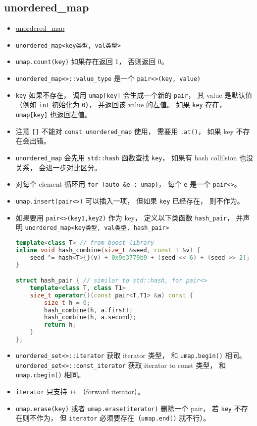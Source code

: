 \subsection{unordered\_map}
\begin{itemize}
\item \href{https://cplusplus.com/reference/unordered_map/unordered_map/}{unordered\_map}
\item \verb|unordered_map<key类型, val类型>|
\item \verb|umap.count(key)| 如果存在返回 1， 否则返回 0。
\item \verb|unordered_map<>::value_type| 是一个 \verb|pair<>(key, value)|
\item \verb|key| 如果不存在， 调用 \verb|umap[key]| 会生成一个新的 \verb|pair|， 其 value 是默认值 （例如 \verb|int| 初始化为 \verb|0|）， 并返回该 value 的左值。 如果 \verb|key| 存在， \verb|umap[key]| 也返回左值。
\item 注意 \verb|[]| 不能对 \verb|const unordered_map| 使用， 需要用 \verb|.at()|， 如果 key 不存在会出错。
\item \verb|unordered_map| 会先用 \verb|std::hash| 函数查找 \verb|key|， 如果有 hash collilsion 也没关系， 会进一步对比区分。
\item 对每个 element 循环用 \verb|for (auto &e : umap)|， 每个 \verb|e| 是一个 \verb|pair<>|。
\item \verb|umap.insert(pair<>)| 可以插入一项， 但如果 \verb|key| 已经存在， 则不作为。
\item 如果要用 \verb|pair<>(key1,key2)| 作为 key， 定义以下类函数 \verb|hash_pair|， 并声明 \verb|unordered_map<key类型, val类型, hash_pair>|
\begin{lstlisting}[language=cpp]
template<class T> // from boost library
inline void hash_combine(size_t &seed, const T &v) {
    seed ^= hash<T>{}(v) + 0x9e3779b9 + (seed << 6) + (seed >> 2);
}

struct hash_pair { // similar to std::hash, for pair<>
    template<class T, class T1>
    size_t operator()(const pair<T,T1> &a) const {
        size_t h = 0;
        hash_combine(h, a.first);
        hash_combine(h, a.second);
        return h;
    }
};
\end{lstlisting}
\item \verb|unordered_set<>::iterator| 获取 iterator 类型， 和 \verb|umap.begin()| 相同。 \verb|unordered_set<>::const_iterator| 获取 iterator to const 类型， 和 \verb|umap.cbegin()| 相同。
\item \verb|iterator| 只支持 \verb|++| （forward iterator）。
\item \verb|umap.erase(key)| 或者 \verb|umap.erase(iterator)| 删除一个 pair， 若 \verb|key| 不存在则不作为， 但 \verb|iterator| 必须要存在（\verb|umap.end()| 就不行）。
\end{itemize}

